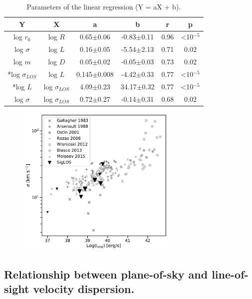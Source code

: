 \documentclass[fleqn,usenatbib, useAMS, a4paper]{mnras}
\begin{document}
\begin{table}
\begin{center}\caption{Parameters of the linear regression (Y = aX + b).}
\begin{tabular}{cccccc}\hline
Y                    &X         &a               &b                &r     & p                \\ \hline
log \(r_0\)          &log \(R\) &0.65\(\pm\)0.06 &-0.83\(\pm\)0.11 & 0.96 & <10\(^{-5}\)    \\ 
log \(\sigma\)       &log \(L\) &0.16\(\pm\)0.05 &-5.54\(\pm\)2.13 & 0.71 & 0.02             \\
log \(m\)            &log \(D\) &0.05\(\pm\)0.02 &-0.05\(\pm\)0.03 & 0.73 & 0.02  \\ 
*log \(\sigma_{LOS}\) &log \(L\) &0.145\(\pm\)0.008 &-4.42\(\pm\)0.33 & 0.77 & <10\(^{-5}\)  \\ 
*log \(L\) &log \(\sigma_{LOS}\) &4.09\(\pm\)0.23 &34.17\(\pm\)0.32 & 0.77 & <10\(^{-5}\)  \\ 
log \(\sigma\)       &log \(\sigma_{LOS}\) &0.72\(\pm\)0.27 &-0.14\(\pm\)0.31 &0.68 & 0.02 \\ \hline
\end{tabular}\label{tab:RestStats}
\end{center}
\end{table} 

\begin{figure}
\centering 
\includegraphics[width=3in]{Figures/lvss.pdf}
\caption{}
\label{fig:sigvsl}
\end{figure}

\subsection{Relationship between plane-of-sky and line-of-sight velocity dispersion.}
\end{document}
